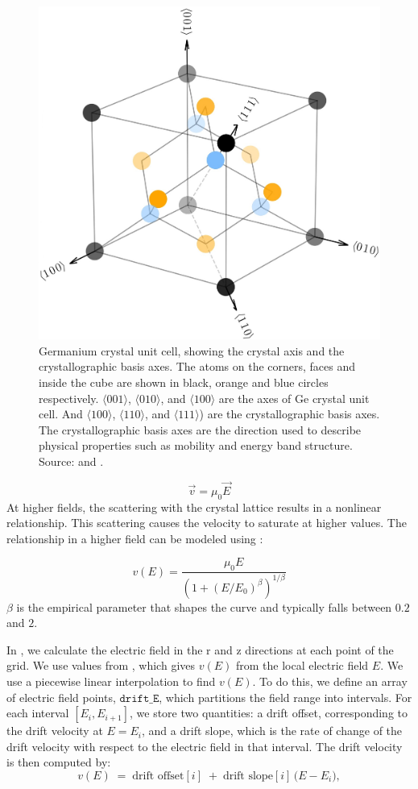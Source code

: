 \begin{figure}[!htb]
\centering
    \includegraphics[trim={0cm 0 0cm 0},clip,width=0.6\linewidth]{ch3/figs/ge_crystal_axes.jpg}
    \caption{Germanium crystal unit cell, showing the crystal axis and the crystallographic basis axes. The atoms on the corners, faces and inside the cube are shown in black, orange and blue circles respectively. $\langle 001\rangle$, $\langle 010\rangle$, and $\langle 100\rangle$ are the axes of Ge crystal unit cell. And $\langle 100\rangle$, $\langle 110\rangle$, and $\langle 111\rangle$) are the crystallographic basis axes. The crystallographic basis axes are the direction used to describe physical properties such as mobility and energy band structure. Source: \cite{HervasAguilar2023} and \cite{Kittel2005}.}
    \label{ch3_figs_ge_crystal_axes}
\end{figure}


\begin{equation}
\vec{v} = \mu_0 \vec{E}
\end{equation}
At higher fields, the scattering with the crystal lattice results in a nonlinear relationship. This scattering causes the velocity to saturate at higher values. The relationship in a higher field can be modeled using \cite{Caughey_1448053}:

\begin{equation}
v(E) = \frac{\mu_0 E}{(1 + (E/E_0)^\beta)^{1/\beta}}
\end{equation}
$\beta$ is the empirical parameter that shapes the curve and typically falls between $0.2$ and $2$.

In {\ehd}, we calculate the electric field in the r and z directions at each point of the grid. We use values from \cite{OMAR19871351}, which gives $v(E)$ from the local electric field $E$. We use a piecewise linear interpolation to find $v(E)$. To do this, we define an array of electric field points, $\texttt{drift\_E}$, which partitions the field range into intervals. For each interval $[E_i, E_{i+1}]$, we store two quantities: a drift offset, corresponding to the drift velocity at $E = E_i$, and a drift slope, which is the rate of change of the drift velocity with respect to the electric field in that interval. The drift velocity is then
computed by:
\begin{equation}
  v(E) \;=\; \text{drift offset}[i]
\;+\; \text{drift slope}[i] \,\bigl( E - E_i \bigr),  
\end{equation}

